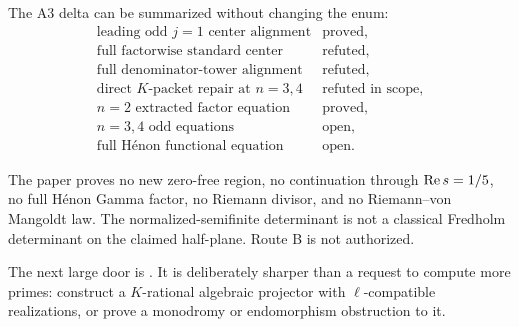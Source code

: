 The A3 delta can be summarized without changing the enum:
\[
\begin{array}{ll}
\text{leading odd \(j=1\) center alignment}&\text{proved},\\
\text{full factorwise standard center}&\text{refuted},\\
\text{full denominator-tower alignment}&\text{refuted},\\
\text{direct \(K\)-packet repair at \(n=3,4\)}&\text{refuted in scope},\\
\text{\(n=2\) extracted factor equation}&\text{proved},\\
\text{\(n=3,4\) odd equations}&\text{open},\\
\text{full H\'enon functional equation}&\text{open}.
\end{array}
\]

The paper proves no new zero-free region, no continuation through
\(\operatorname{Re} s=1/5\), no full H\'enon Gamma factor, no Riemann divisor, and no
Riemann--von Mangoldt law.  The normalized-semifinite determinant is not a
classical Fredholm determinant on the claimed half-plane.  Route B is not
authorized.

The next large door is .  It is deliberately sharper
than a request to compute more primes: construct a \(K\)-rational algebraic
projector with \(\ell\)-compatible realizations, or prove a monodromy or
endomorphism obstruction to it.
